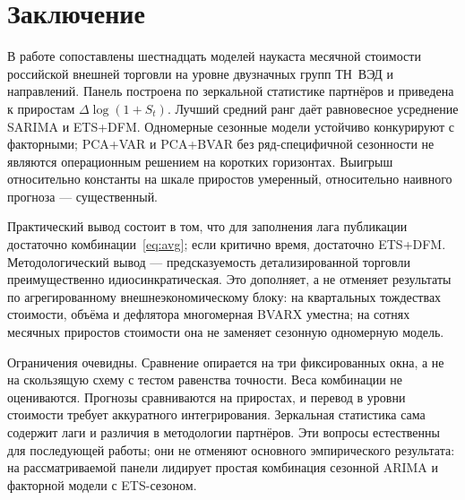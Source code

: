 \documentclass[12pt]{article}
\begin{document}
\section{Заключение}

В работе сопоставлены шестнадцать моделей наукаста месячной стоимости российской внешней торговли на уровне двузначных групп ТН~ВЭД и направлений. Панель построена по зеркальной статистике партнёров и приведена к приростам $\Delta\log(1+S_t)$. Лучший средний ранг даёт равновесное усреднение SARIMA и ETS+DFM. Одномерные сезонные модели устойчиво конкурируют с факторными; PCA+VAR и PCA+BVAR без ряд-специфичной сезонности не являются операционным решением на коротких горизонтах. Выигрыш относительно константы на шкале приростов умеренный, относительно наивного прогноза --- существенный.

Практический вывод состоит в том, что для заполнения лага публикации достаточно комбинации~\eqref{eq:avg}; если критично время, достаточно ETS+DFM. Методологический вывод --- предсказуемость детализированной торговли преимущественно идиосинкратическая. Это дополняет, а не отменяет результаты \citet{slabolitskiy2026} по агрегированному внешнеэкономическому блоку: на квартальных тождествах стоимости, объёма и дефлятора многомерная BVARX уместна; на сотнях месячных приростов стоимости она не заменяет сезонную одномерную модель.

Ограничения очевидны. Сравнение опирается на три фиксированных окна, а не на скользящую схему с тестом равенства точности. Веса комбинации не оцениваются. Прогнозы сравниваются на приростах, и перевод в уровни стоимости требует аккуратного интегрирования. Зеркальная статистика сама содержит лаги и различия в методологии партнёров. Эти вопросы естественны для последующей работы; они не отменяют основного эмпирического результата: на рассматриваемой панели лидирует простая комбинация сезонной ARIMA и факторной модели с ETS-сезоном.

\singlespacing
\printbibliography[title={Литература}]
\end{document}
